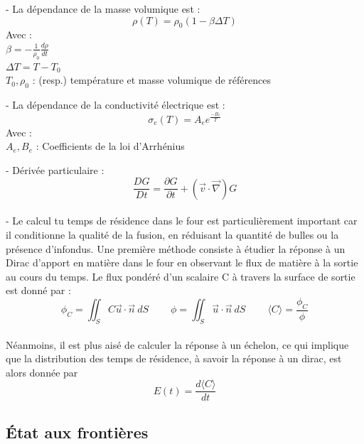 \documentclass[12pt, a4paper, french, BCOR = 0pt, DIV = 10]{scrartcl}
\begin{document}
	
	\raggedright
	- La dépendance de la masse volumique est :
	$$ \rho(T) = \rho_{0}  (1 - \beta \Delta T) $$
    \setlength{\parindent}{20pt}
    Avec : \\
    $\beta = -\frac{1}{\rho_{0}} \frac{d\rho}{dt}$\\
    $\Delta T = T-T_0$\\
    $T_0, \rho_0$ : (resp.) température et masse volumique de références\\[0.5 cm]
	\setlength{\parindent}{0pt}
	
	
	- La dépendance de la conductivité électrique est :
    $$ \sigma_{e} (T) =  A_{e} e^{\frac{-B_{e}}{T}}	$$
    \setlength{\parindent}{20pt}
    Avec :\\
    $A_e,B_e$ : Coefficients de la loi d'Arrhénius\break\\[0.5 cm]
    \setlength{\parindent}{0pt}
    
	- Dérivée particulaire : \\
	$$ \frac{DG}{Dt}=\frac{\partial G}{\partial t} + (\vec {v} \cdot \vec {\nabla } ) G
	$$\\[0.5cm]
	
	
	
	- Le calcul tu temps de résidence dans le four est particulièrement important car il conditionne la qualité de la fusion, en réduisant la quantité de bulles ou la présence d'infondus. Une première méthode consiste à étudier la réponse à un Dirac d'apport en matière dans le four en observant le flux de matière à la sortie au cours du temps. Le flux pondéré d'un scalaire C à travers la surface de sortie est donné par :\\[0.3 cm]
	$$
	\phi_{C} =  \iint_S C\vec{u} \cdot \vec{n}~dS  ~~~~~~~~~~ \phi = \iint_S \vec{u} \cdot \vec{n}~dS  ~~~~~~~~~~
	\langle C \rangle = \frac{\phi_{C}}{\phi}
	$$ 
	\\ [0.5 cm]
	Néanmoins, il est plus aisé de calculer la réponse à un échelon, ce qui implique que la distribution des temps de résidence, à savoir la réponse à un dirac, est alors donnée par \[E(t)=\frac{d\langle C \rangle}{dt}\]
	
	\subsection{État aux frontières}
	
\end{document}
